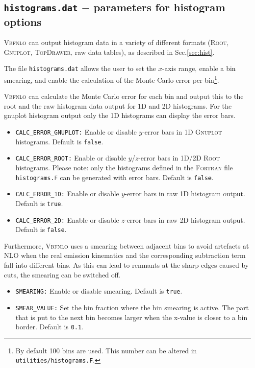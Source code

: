 \documentclass[english,12pt]{article}
\begin{document}


\subsection{{\tt histograms.dat} $-$ parameters for histogram options}
\label{sec:histdat}

\textsc{Vbfnlo} can output histogram data in a variety of different formats
(\textsc{Root}, \textsc{Gnuplot}, \textsc{TopDrawer}, raw data tables), as
described in Sec.\ref{sec:hist}.

The file {\tt histograms.dat} allows the user to set the $x$-axis range,
enable a bin smearing, and enable the calculation of the Monte Carlo
error per bin\footnote{By default 100 bins are used.  This number can
be altered in {\tt utilities/histograms.F}.}.

\noindent\textsc{Vbfnlo} can calculate the Monte Carlo error for each bin and output
this to the root and the raw histogram data output for 1D and 2D histograms.
For the gnuplot histogram output only the 1D histograms can display the error bars.
%
\begin{itemize}
 \item {\tt CALC\_ERROR\_GNUPLOT:} Enable or disable $y$-error bars in 1D \textsc{Gnuplot} histograms.
                                   Default is {\tt false}.
 \item {\tt CALC\_ERROR\_ROOT:} Enable or disable $y$/$z$-error bars in 1D/2D \textsc{Root} histograms.
                                Please note: only the histograms defined in the \textsc{Fortran}
                                file {\tt histograms.F} can be generated with error bars.
                                Default is {\tt false}.
 \item {\tt CALC\_ERROR\_1D:} Enable or disable $y$-error bars in raw 1D histogram output.
                              Default is {\tt true}.
 \item {\tt CALC\_ERROR\_2D:} Enable or disable $z$-error bars in raw 2D histogram output.
                              Default is {\tt false}.
\end{itemize}
%
Furthermore, \textsc{Vbfnlo} uses a smearing between adjacent bins to avoid
artefacts at NLO when the real emission kinematics and the corresponding
subtraction term fall into different bins. As this can lead to remnants at the sharp
edges caused by cuts, the smearing can be switched off.
\begin{itemize}
 \item {\tt SMEARING:} Enable or disable smearing.  Default is {\tt true}.
 \item {\tt SMEAR\_VALUE:} Set the bin fraction where the bin smearing is active.
                          The part that is put to the next bin becomes larger when
                          the x-value is closer to a bin border. Default is {\tt 0.1}.
\end{itemize}
\end{document}
